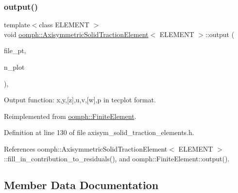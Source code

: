 \subsubsection{\texorpdfstring{output()}{output()}\hspace{0.1cm}{\footnotesize\ttfamily [4/4]}}
{\footnotesize\ttfamily template$<$class E\+L\+E\+M\+E\+NT $>$ \\
void \hyperlink{classoomph_1_1AxisymmetricSolidTractionElement}{oomph\+::\+Axisymmetric\+Solid\+Traction\+Element}$<$ E\+L\+E\+M\+E\+NT $>$\+::output (\begin{DoxyParamCaption}\item[{F\+I\+LE $\ast$}]{file\+\_\+pt,  }\item[{const unsigned \&}]{n\+\_\+plot }\end{DoxyParamCaption})\hspace{0.3cm}{\ttfamily [inline]}, {\ttfamily [virtual]}}



Output function\+: x,y,\mbox{[}z\mbox{]},u,v,\mbox{[}w\mbox{]},p in tecplot format. 



Reimplemented from \hyperlink{classoomph_1_1FiniteElement_adfaee690bb0608f03320eeb9d110d48c}{oomph\+::\+Finite\+Element}.



Definition at line 130 of file axisym\+\_\+solid\+\_\+traction\+\_\+elements.\+h.



References oomph\+::\+Axisymmetric\+Solid\+Traction\+Element$<$ E\+L\+E\+M\+E\+N\+T $>$\+::fill\+\_\+in\+\_\+contribution\+\_\+to\+\_\+residuals(), and oomph\+::\+Finite\+Element\+::output().



\subsection{Member Data Documentation}
\mbox{\label{classoomph_1_1AxisymmetricSolidTractionElement_af81e4c31c910c253faeeba17f1070000}} 
